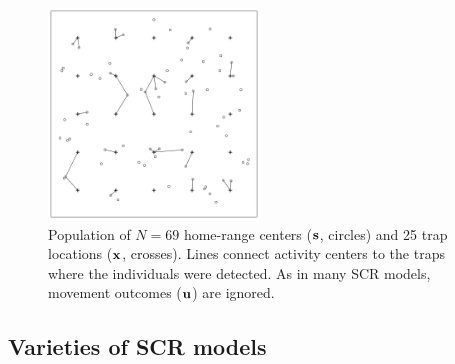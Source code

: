 \begin{figure}
\begin{center}
\includegraphics[width=0.5\textwidth]{Ch1b/figs/SCR0}
\end{center}
\caption{Population of $N=69$ home-range centers ($\bf s$,
  circles) and 25 trap locations ($\bf x$, crosses). Lines connect
  activity centers to the traps where the individuals were
  detected. As in many SCR models, movement outcomes ($\bf u$)
  are ignored.}
\label{modeling.fig.fig1}
\end{figure}

\subsection{Varieties of SCR models}

